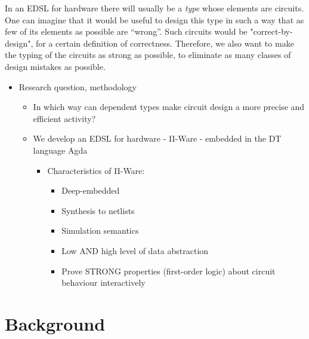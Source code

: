 \documentclass[a4paper,draft]{report}
\begin{document}
        In an EDSL for hardware there will usually be a \emph{type} whose elements are circuits.
        One can imagine that it would be useful to design this type in such a way that as few of its elements as possible are ``wrong''.
        Such circuits would be "correct-by-design", for a certain definition of correctness.
        Therefore, we also want to make the typing of the circuits as strong as possible,
        to eliminate as many classes of design mistakes as possible.


        \begin{itemize}
            \item Research question, methodology
            \begin{itemize}
                \item In which way can dependent types make circuit design a more precise and efficient activity?
                \item We develop an EDSL for hardware - Π-Ware - embedded in the DT language Agda
                \begin{itemize}
                    \item Characteristics of Π-Ware:
                    \begin{itemize}
                        \item Deep-embedded
                        \item Synthesis to netlists
                        \item Simulation semantics
                        \item Low AND high level of data abstraction
                        \item Prove STRONG properties (first-order logic) about circuit behaviour interactively
                    \end{itemize}
                \end{itemize}
            \end{itemize}
        \end{itemize}


    \chapter{Background}
    \label{chap:hardware}
\end{document}
